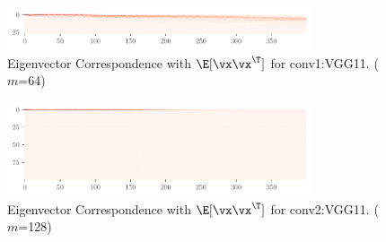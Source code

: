 

\begin{figure}[H]
    \centering
    \captionsetup{justification=centering}
    \includegraphics[width=0.8\textwidth]{Appendix_Figures/Correspondance/xxT_Truexxt_corr_expand_t400_CIFAR10_Exp1_VGG11_nobn_fixlr0.01_E-1_features.0.pdf}

    \caption{Eigenvector Correspondence with $\E[\vx\vx^\T]$ for conv1:VGG11. ($m$=64)}
    \label{fig:Corr_VGG_conv1}
\end{figure}

\begin{figure}[H]
    \centering
    \captionsetup{justification=centering}
    \includegraphics[width=0.8\textwidth]{Appendix_Figures/Correspondance/xxT_Truexxt_corr_expand_t400_CIFAR10_Exp1_VGG11_nobn_fixlr0.01_E-1_features.3.pdf}

    \caption{Eigenvector Correspondence with $\E[\vx\vx^\T]$ for conv2:VGG11. ($m$=128)}
    \label{fig:Corr_VGG_conv2}
\end{figure}

